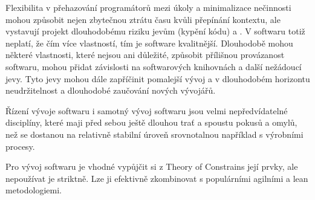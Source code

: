 \documentclass[11pt]{article}
\begin{document}
Flexibilita v přehazování programátorů mezi úkoly a minimalizace nečinnosti
mohou způsobit nejen zbytečnou ztrátu času kvůli přepínání kontextu, ale
vystavují projekt dlouhodobému riziku jevům  (kypění kódu) a
. V softwaru totiž neplatí, že čím více vlastností, tím je
software kvalitnější. Dlouhodobě mohou některé vlastnosti, které nejsou ani
důležité, způsobit přílišnou provázanost softwaru, mohou přidat závislosti na
softwarových knihovnách a další nežádoucí jevy. Tyto jevy mohou dále zapříčinit
pomalejší vývoj a v dlouhodobém horizontu neudržitelnost a dlouhodobé zaučování
nových vývojářů.

Řízení vývoje softwaru i samotný vývoj softwaru jsou velmi nepředvídatelné
disciplíny, které maji před sebou ještě dlouhou trať a spoustu pokusů a omylů,
než se dostanou na relativně stabilní úroveň srovnotalnou například s výrobními
procesy.

Pro vývoj softwaru je vhodné vypůjčit si z Theory of Constrains její prvky, ale
nepoužívat je striktně. Lze ji efektivně zkombinovat s populárními agilními a
lean metodologiemi.







\end{document}
